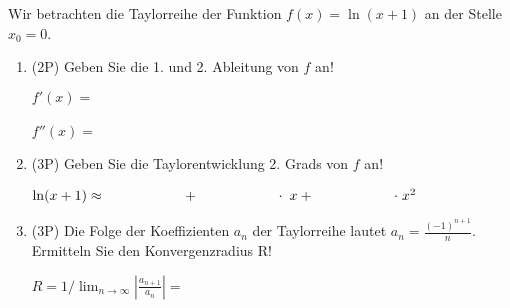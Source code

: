 Wir betrachten die Taylorreihe der Funktion $f(x) = \ln(x+1)$ an der Stelle $x_0=0$.

\begin{enumerate}[label=(\alph*)]

\item (2P) Geben Sie die 1. und 2. Ableitung von $f$ an!

\bigskip

$f'(x) = $ \\
\bigskip \\
$f''(x) = $
\bigskip
\bigskip

\item (3P) Geben Sie die Taylorentwicklung 2. Grads von $f$ an!

\bigskip
\bigskip

$\ln(x+1) \approx \hspace{2cm}   + \hspace{2cm} \cdot \hspace{1mm} x + \hspace{2cm} \cdot \hspace{1mm} x^2$
\bigskip
\bigskip
\bigskip
\bigskip


\item (3P) Die Folge der Koeffizienten $a_n$ der Taylorreihe lautet $a_n=\frac{(-1)^{n+1}}{n}$. Ermitteln Sie den Konvergenzradius R!

\bigskip

$R=1/\lim_{n\to \infty} |\frac{a_{n+1}}{a_n}| = $

\end{enumerate}
